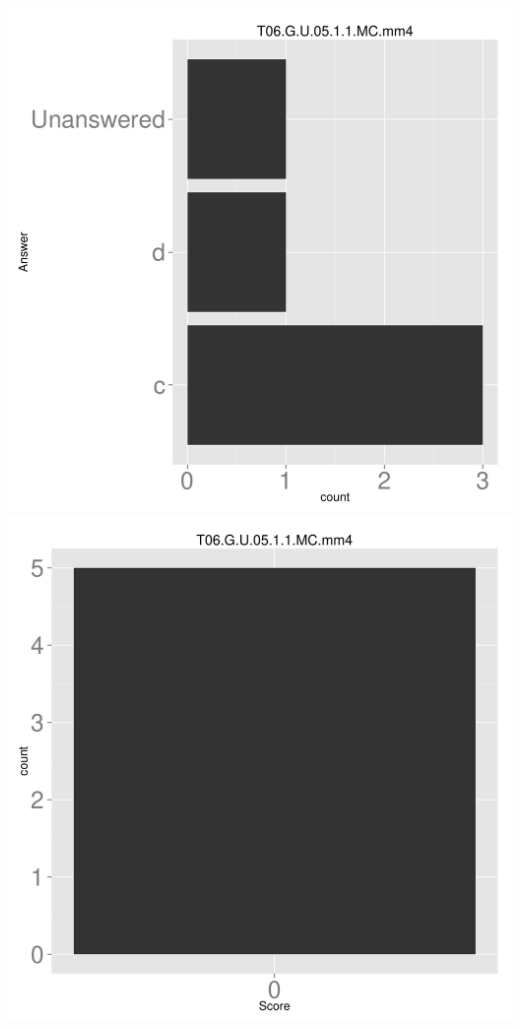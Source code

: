 \documentclass[12pt,english,nohyper]{tufte-handout}\usepackage[]{graphicx}\usepackage[]{color}
\begin{document}
\begin{center} \includegraphics[width=.45\linewidth]{Topic06_AB_85_answer} \includegraphics[width=.45\linewidth]{Topic06_AB_85_score} \end{center} 
\end{document}
